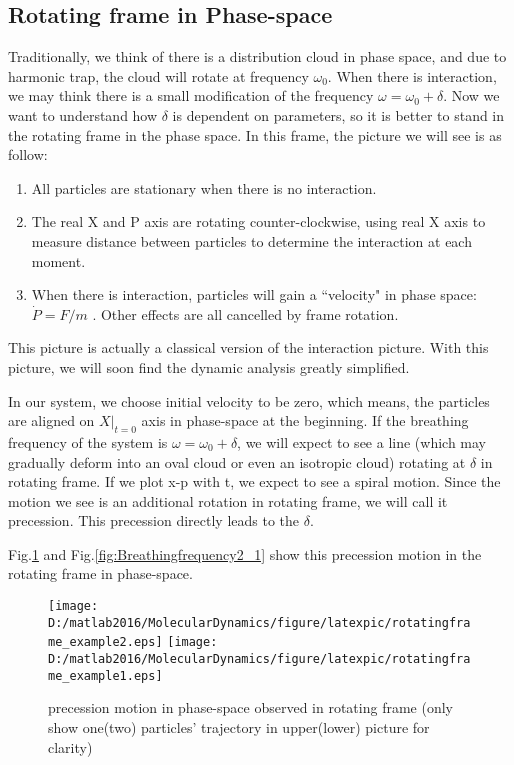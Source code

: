 \documentclass[aps,pre,twocolumn
,groupedaddress]{revtex4-1}
\begin{document}
\subsection{Rotating frame in Phase-space}
Traditionally, we think of there is a distribution cloud in phase space, and due to harmonic trap, the cloud will rotate at frequency $\omega_0$. When there is interaction, we may think there is a small modification of the frequency $\omega=\omega_0+\delta$. Now we want to understand how $\delta$ is dependent on parameters, so it is better to stand in the rotating frame in the phase space. In this frame, the picture we will see is as follow:\\
\begin{enumerate}[\textbf{*}]
\item All particles are stationary when there is no interaction.
\item The real X and P axis are rotating counter-clockwise, using real X axis to measure distance between particles to determine the interaction at each moment.
\item When there is interaction, particles will gain a ``velocity" in phase space: $\dot{P}=F/m$ . Other effects are all cancelled by frame rotation.
\end{enumerate}


This picture is actually a classical version of the interaction picture. With this picture, we will soon find the dynamic analysis greatly simplified.

In our system, we choose initial velocity to be zero, which means, the particles are aligned on $X|_{t=0}$ axis in phase-space at the beginning. If the breathing frequency of the system is $\omega=\omega_0+\delta$, we will expect to see a line (which may gradually deform into an oval cloud or even an isotropic cloud) rotating at $\delta$ in rotating frame. If we plot x-p with t, we expect to see a spiral motion. Since the motion we see is an additional rotation in rotating frame, we will call it precession. This precession directly leads to the $\delta$.

Fig.\ref{fig:Breathingfrequency2} and Fig.\ref{fig:Breathingfrequency2_1} show this precession motion in the rotating frame in phase-space.


\begin{figure}
\centering
\texttt{[image: D:/matlab2016/MolecularDynamics/figure/latexpic/rotatingframe\_example2.eps]} 
\texttt{[image: D:/matlab2016/MolecularDynamics/figure/latexpic/rotatingframe\_example1.eps]} 
\caption{precession motion in phase-space observed in rotating frame (only show one(two) particles' trajectory in upper(lower) picture for clarity)}
\label{fig:Breathingfrequency2}
\end{figure}
\end{document}
